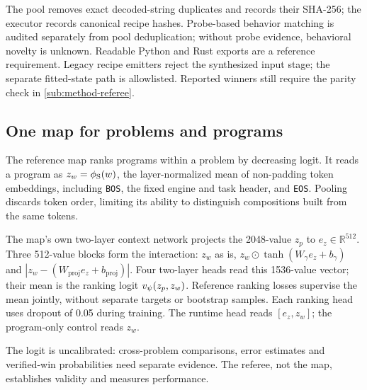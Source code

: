 The pool removes exact decoded-string duplicates and records
their SHA-256; the executor records canonical recipe hashes. Probe-based
behavior matching is audited separately from pool deduplication; without
probe evidence, behavioral novelty is unknown. Readable Python and Rust exports are a reference requirement.
Legacy recipe emitters reject the synthesized input stage; the separate
fitted-state path is allowlisted. Reported winners still require the parity
check in \cref{sub:method-referee}.

\subsection{One map for problems and programs}\label{sub:method-map}

The reference map ranks programs within a problem by decreasing logit.
It reads a program as $z_w=\phi_{\mathrm{S}}(w)$, the layer-normalized mean of
non-padding token embeddings, including \texttt{BOS}, the fixed engine and
task header, and \texttt{EOS}. Pooling discards token order, limiting its
ability to distinguish \mbox{compositions} built from the same tokens.

The map's own two-layer context network projects the \num{2048}-value $z_p$
to $e_z\in\mathbb{R}^{512}$. Three 512-value blocks form the interaction:
$z_w$ as is, $z_w\odot\tanh(W_\gamma e_z+b_\gamma)$ and
$|z_w-(W_{\mathrm{proj}}e_z+b_{\mathrm{proj}})|$.
Four two-layer heads read this \num{1536}-value vector; their mean is the
ranking logit $v_{\psi}(z_p,z_w)$. Reference ranking losses supervise the mean
jointly, without separate targets or bootstrap samples. Each ranking head
uses dropout of 0.05 during training. The runtime head reads $[e_z,z_w]$;
the program-only control reads $z_w$.

The logit is uncalibrated: cross-problem comparisons, error estimates and
verified-win probabilities need separate evidence. The referee, not the map,
establishes validity and measures performance.

